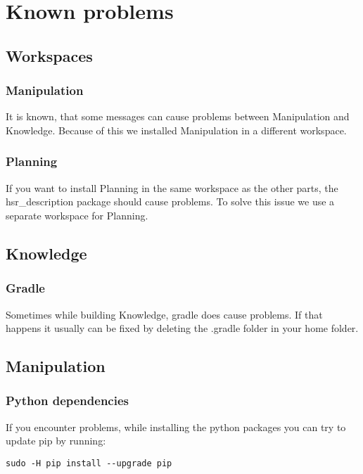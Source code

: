 \documentclass[main.tex]{subfiles}
\begin{document}
	\section{Known problems}

	\subsection{Workspaces}
	\subsubsection{Manipulation}
	It is known, that some messages can cause problems between Manipulation and Knowledge. Because of this we installed Manipulation in a different workspace.
	
	\subsubsection{Planning}
	If you want to install Planning in the same workspace as the other parts, the hsr\_description package should cause problems. To solve this issue we use a separate workspace for Planning.
	

	\subsection{Knowledge}
	\subsubsection{Gradle}
	Sometimes while building Knowledge, gradle does cause problems.
	If that happens it usually can be fixed by deleting the .gradle folder in your home folder.
	
	\subsection{Manipulation}
	\subsubsection{Python dependencies}
	If you encounter problems, while installing the python packages you can try to update pip by running:
	\begin{lstlisting}
sudo -H pip install --upgrade pip
\end{lstlisting}	
	
\end{document}
